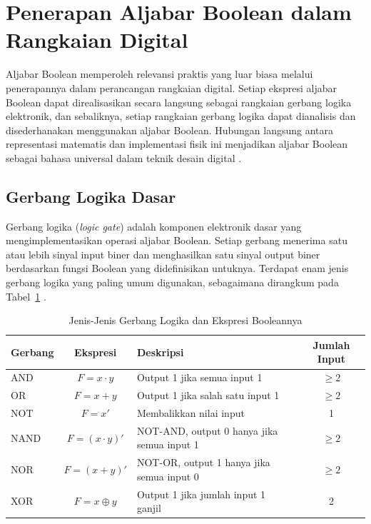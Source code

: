 \section{Penerapan Aljabar Boolean dalam Rangkaian Digital}

Aljabar Boolean memperoleh relevansi praktis yang luar biasa melalui penerapannya dalam perancangan rangkaian digital. Setiap ekspresi aljabar Boolean dapat direalisasikan secara langsung sebagai rangkaian gerbang logika elektronik, dan sebaliknya, setiap rangkaian gerbang logika dapat dianalisis dan disederhanakan menggunakan aljabar Boolean. Hubungan langsung antara representasi matematis dan implementasi fisik ini menjadikan aljabar Boolean sebagai bahasa universal dalam teknik desain digital \cite{grinnell_logic}.

\subsection{Gerbang Logika Dasar}

Gerbang logika (\textit{logic gate}) adalah komponen elektronik dasar yang mengimplementasikan operasi aljabar Boolean. Setiap gerbang menerima satu atau lebih sinyal input biner dan menghasilkan satu sinyal output biner berdasarkan fungsi Boolean yang didefinisikan untuknya. Terdapat enam jenis gerbang logika yang paling umum digunakan, sebagaimana dirangkum pada Tabel~\ref{tab:gerbang-logika} \cite{hackatronic}.

\begin{table}[htbp]
\centering
\small
\renewcommand{\arraystretch}{1.3}
\begin{tabular}{|l|c|>{\raggedright\arraybackslash}p{4.5cm}|c|}
\hline
\textbf{Gerbang} & \textbf{Ekspresi} & \textbf{Deskripsi} & \textbf{Jumlah Input} \\ \hline
AND & $F = x \cdot y$ & Output 1 jika semua input 1 & $\geq 2$ \\ \hline
OR & $F = x + y$ & Output 1 jika salah satu input 1 & $\geq 2$ \\ \hline
NOT & $F = x'$ & Membalikkan nilai input & 1 \\ \hline
NAND & $F = (x \cdot y)'$ & NOT-AND, output 0 hanya jika semua input 1 & $\geq 2$ \\ \hline
NOR & $F = (x + y)'$ & NOT-OR, output 1 hanya jika semua input 0 & $\geq 2$ \\ \hline
XOR & $F = x \oplus y$ & Output 1 jika jumlah input 1 ganjil & 2 \\ \hline
\end{tabular}
\caption{Jenis-Jenis Gerbang Logika dan Ekspresi Booleannya}
\label{tab:gerbang-logika}
\end{table}

